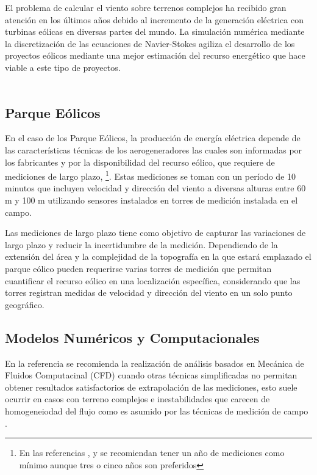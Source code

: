 El problema de calcular el viento sobre terrenos complejos ha recibido gran atención en los últimos años debido al incremento de la generación eléctrica con turbinas eólicas en diversas partes del mundo. La simulación numérica mediante la discretización de las ecuaciones de Navier-Stokes agiliza el desarrollo de los proyectos eólicos mediante una mejor estimación del recurso energético que hace viable a este tipo de proyectos.
\\
\\\subsection{Parque Eólicos}
En el caso de los Parque Eólicos, la producción de energía eléctrica depende de las características técnicas de los aerogeneradores las cuales son informadas por los fabricantes y por la disponibilidad del recurso eólico, que requiere de mediciones de largo plazo, \footnote{En las referencias  \citep{wbank_guidelines_2014}, \citep{sanz_state---art_2010} y \citep{bailey_wind_1997} se recomiendan tener un año de mediciones como mínimo aunque tres o cinco años son preferidos}. Estas mediciones se toman con un período de 10 minutos que incluyen velocidad y dirección del viento a diversas alturas entre 60 m y 100 m utilizando  sensores instalados en torres de medición instalada en el campo. 

Las mediciones de largo plazo tiene como objetivo de capturar las variaciones de largo plazo y reducir la incertidumbre de la medición. Dependiendo de la extensión del área y la complejidad de la topografía en la que estará emplazado el parque eólico pueden requerirse varias torres de medición que permitan cuantificar el recurso eólico en una localización específica, considerando que las torres registran medidas de velocidad y dirección del viento en un solo punto geográfico.

\subsection{Modelos Numéricos y Computacionales}

En la referencia \citep{wbank_guidelines_2014} se recomienda la realización de análisis basados en Mecánica de Fluidos Computacinal  (CFD) cuando otras técnicas simplificadas no permitan obtener resultados satisfactorios de extrapolación de las mediciones, esto suele ocurrir en casos con terreno complejos e inestabilidades que carecen de homogeneiodad del flujo como es asumido por las técnicas de medición de campo \citep{sanz_state---art_2010}.

